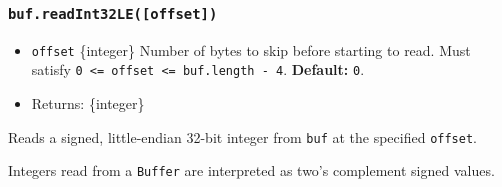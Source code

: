 \subsubsection{\texorpdfstring{\texttt{buf.readInt32LE({[}offset{]})}}{buf.readInt32LE({[}offset{]})}}\label{buf.readint32leoffset}

\begin{itemize}
\tightlist
\item
  \texttt{offset} \{integer\} Number of bytes to skip before starting to
  read. Must satisfy
  \texttt{0\ \textless{}=\ offset\ \textless{}=\ buf.length\ -\ 4}.
  \textbf{Default:} \texttt{0}.
\item
  Returns: \{integer\}
\end{itemize}

Reads a signed, little-endian 32-bit integer from \texttt{buf} at the
specified \texttt{offset}.

Integers read from a \texttt{Buffer} are interpreted as two's complement
signed values.

\begin{Shaded}
\begin{Highlighting}[]
\NormalTok{ \{ }\NormalTok{ \} } \OperatorTok{;}

\OperatorTok{=} \NormalTok{([}\OperatorTok{,} \OperatorTok{,} \OperatorTok{,} \NormalTok{])}\OperatorTok{;}

\NormalTok{(}\NormalTok{))}\OperatorTok{;}
\NormalTok{(}\NormalTok{))}\OperatorTok{;}
\end{Highlighting}
\end{Shaded}

